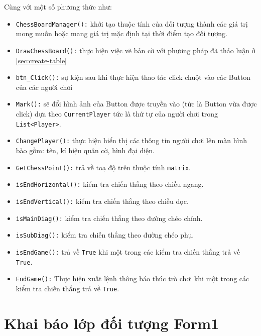 Cùng với một số phương thức như:
\begin{itemize}
	\item \texttt{ChessBoardManager():} khởi tạo thuộc tính của đối tượng thành các giá trị mong muốn hoặc mang giá trị mặc định tại thời điểm tạo đối tượng.
	\item \texttt{DrawChessBoard():} thực hiện việc vẽ bản cờ với phương pháp đã thảo luận ở \ref{sec:create-table}
	\item \texttt{btn\_Click():} sự kiện sau khi thực hiện thao tác click chuột vào các Button của các người chơi
	\item \texttt{Mark():} sẽ đổi hình ảnh của Button được truyền vào (tức là Button vừa được click) dựa theo \texttt{CurrentPlayer} tức là thứ tự của người chơi trong \texttt{List<Player>}.
	\item \texttt{ChangePlayer():} thực hiện hiển thị các thông tin người chơi lên màn hình bào gồm: tên, kí hiệu quân cờ, hình đại diện.
	\item \texttt{GetChessPoint():} trả về toạ độ trên thuộc tính \texttt{matrix}.
	\item \texttt{isEndHorizontal():} kiểm tra chiến thắng theo chiều ngang.
	\item \texttt{isEndVertical():} kiểm tra chiến thắng theo chiều dọc.
	\item \texttt{isMainDiag():} kiểm tra chiến thắng theo đường chéo chính.
	\item \texttt{isSubDiag():} kiểm tra chiến thắng theo đường chéo phụ.
	\item \texttt{isEndGame():} trả về \texttt{True} khi một trong các kiểm tra chiến thắng trả về \texttt{True}.
	\item \texttt{EndGame():} Thực hiện xuất lệnh thông báo thúc trò chơi khi một trong các kiểm tra chiến thắng trả về \texttt{True}.
\end{itemize}

\section{Khai báo lớp đối tượng Form1}


